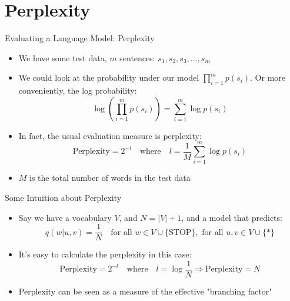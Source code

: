 \documentclass[10pt]{beamer}
\begin{document}
\section{Perplexity}

\begin{frame}{Evaluating a Language Model: Perplexity}
    \scriptsize
    \begin{itemize}
        \item We have some test data, $m$ sentences: $s_1, s_2, s_3, ..., s_m$
        \item We could look at the probability under our model $\prod_{i=1}^{m} p(s_i)$. Or more conveniently, the log probability:
        \[
            \log \left( \prod_{i=1}^{m} p(s_i) \right) = \sum_{i=1}^{m} \log p(s_i)
        \]
        \item In fact, the usual evaluation measure is perplexity:
        \[
            \text{Perplexity} = 2^{-l} \quad \text{where} \quad l = \frac{1}{M} \sum_{i=1}^{m} \log p(s_i)
        \]
        \item $M$ is the total number of words in the test data
    \end{itemize}
\end{frame}

\begin{frame}{Some Intuition about Perplexity}
    \scriptsize
    \begin{itemize}
        \item Say we have a vocabulary $V$, and $N = |V| + 1$, and a model that predicts:
        \[
            q(w|u, v) = \frac{1}{N} \quad \text{for all } w \in V \cup \{\text{STOP}\}, \text{ for all } u, v \in V \cup \{*\}
        \]
        \item It's easy to calculate the perplexity in this case:
        \[
            \text{Perplexity} = 2^{-l} \quad \text{where} \quad l = \log \frac{1}{N} \Rightarrow \text{Perplexity} = N
        \]
        \item Perplexity can be seen as a measure of the effective "branching factor"
    \end{itemize}
\end{frame}
\end{document}
